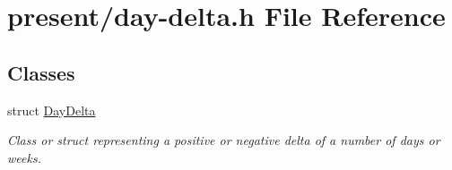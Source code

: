 \hypertarget{day-delta_8h}{\section{present/day-\/delta.h File Reference}
\label{day-delta_8h}
}
\subsection*{Classes}
\begin{DoxyCompactItemize}
\item 
struct \hyperlink{structDayDelta}{Day\-Delta}
\begin{DoxyCompactList}\small\item\em Class or struct representing a positive or negative delta of a number of days or weeks. \end{DoxyCompactList}\end{DoxyCompactItemize}
